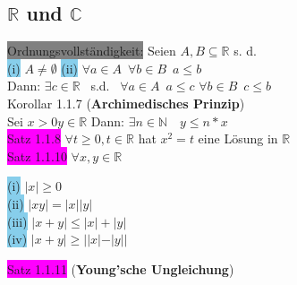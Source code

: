\documentclass[landscape, 10pt]{article}
\newcommand{\R}{\mathbb{R}}
\newcommand{\N}{\mathbb{N}}
\newcommand{\C}{\mathbb{C}}
\begin{document}
\pagestyle{fancy}
\fancyhf{}
\cfoot{\thepage}

\begin{multicols}{3}
\section{$\R$ und $\C$}
              \colorbox{gray}{Ordnungsvollständigkeit:}
                     Seien $A, B\subseteq\R$ s. d.\\
                     \colorbox{SkyBlue}{(i)} 
                            $A\neq\emptyset$ \qquad
                     \colorbox{SkyBlue}{(ii)} 
                            $\forall a\in A \enspace \forall b 
                            \in B \enspace a \leqslant b$ \\
                      Dann: $\exists c\in\R\enspace$ s.d. 
                     $\enspace\forall a\in A\enspace a\leqslant c$
                     $\forall b\in B\enspace c\leqslant b$\\
              \colorbox{BurntOrange}{Korollar 1.1.7} 
              (\textbf{Archimedisches Prinzip})\\
                     Sei \textcolor{NavyBlue}{$x>0 y\in\R$}
                     \quad Dann: \textcolor{NavyBlue}{
                     $\exists n\in \N \quad y\leqslant n*x$}\\
              \colorbox{magenta}{Satz 1.1.8} \textcolor{NavyBlue}{
                     $\forall t\geqslant 0, t\in\R$} hat \textcolor{NavyBlue}{$x^2=t$} 
                     eine Lösung in $\R$\\
              \colorbox{magenta}{Satz 1.1.10} $\forall x,y\in\R$
                     \begin{multicols}{2}
                     \colorbox{SkyBlue}{(i)} $|x|\geqslant 0$ \\
                     \colorbox{SkyBlue}{(ii)} $|xy|=|x||y|$\\
                     \colorbox{SkyBlue}{(iii)} $|x+y|\leqslant |x|+|y|$\\
                     \colorbox{SkyBlue}{(iv)} $|x+y|\geqslant ||x|-|y||$\\
                     \end{multicols}
              \colorbox{magenta}{Satz 1.1.11}
              (\textbf{Young'sche Ungleichung})\\

\end{multicols}
\end{document}
